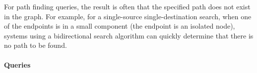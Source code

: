 
For path finding queries, the result is often that the specified path does not
exist in the graph. For example, for a single-source single-destination search,
when one of the endpoints is in a small component (\eg the endpoint is an
isolated node), systems using a bidirectional search algorithm can quickly
determine that there is no path to be found.


\paragraph{Queries}
{\raggedright
}